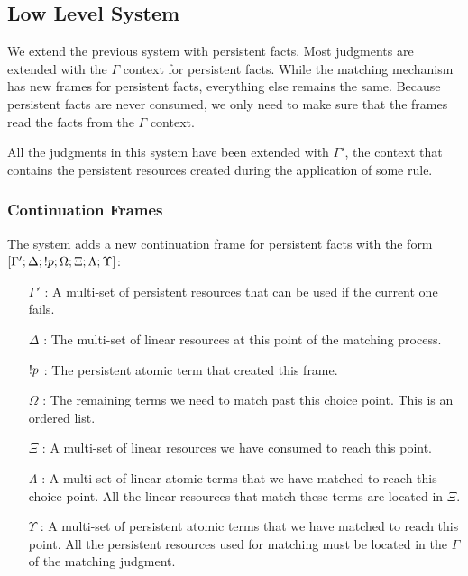 

\newcommand{\strans}[0]{\m{strans} \;}

\subsection{Low Level System}

We extend the previous system with persistent facts. Most judgments are extended with the $\Gamma$ context for persistent facts. While the matching mechanism has new frames for persistent facts, everything else remains the same. Because persistent facts are never consumed, we only need to make sure that the frames read the facts from the $\Gamma$ context.

All the judgments in this system have been extended with $\Gamma'$, the context that contains the persistent resources created during the application of some rule.

\subsubsection{Continuation Frames}

The system adds a new continuation frame for persistent facts with the form $[\Gamma'; \Delta; {!} p; \Omega; \Xi; \Lambda; \Upsilon]$:

\begin{enumerate}
   \item[$\Gamma'$]: A multi-set of persistent resources that can be used if the current one fails.
   \item[$\Delta$]: The multi-set of linear resources at this point of the matching process.
   \item[${!} p$]: The persistent atomic term that created this frame.
   \item[$\Omega$]: The remaining terms we need to match past this choice point. This is an ordered list.
   \item[$\Xi$]: A multi-set of linear resources we have consumed to reach this point.
   \item[$\Lambda$]: A multi-set of linear atomic terms that we have matched to reach this choice point. All the linear resources that match these terms are located in $\Xi$.
   \item[$\Upsilon$]: A multi-set of persistent atomic terms that we have matched to reach this point. All the persistent resources used for matching must be located in the $\Gamma$ of the matching judgment.
\end{enumerate}

